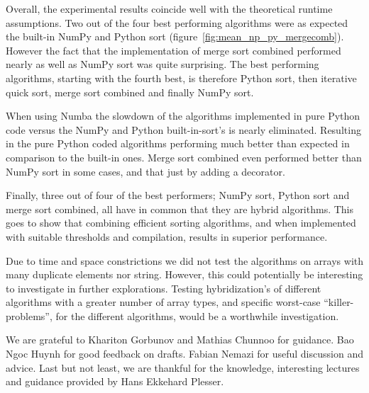 \documentclass[sigconf, nonacm, natbib, screen, balance=False]{acmart}
\begin{document}
Overall, the experimental results coincide well with the theoretical runtime assumptions. Two out of the four best performing algorithms were as expected the built-in NumPy and Python sort (figure~\ref{fig:mean_np_py_mergecomb}). However the fact that the implementation of merge sort combined performed nearly as well as NumPy sort was quite surprising. The best performing algorithms, starting with the fourth best, is therefore Python sort, then iterative quick sort, merge sort combined and finally NumPy sort. 

When using Numba the slowdown of the algorithms implemented in pure Python code versus the NumPy and Python built-in-sort's is nearly eliminated. Resulting in the pure Python coded algorithms performing much better than expected in comparison to the built-in ones. Merge sort combined even performed better than NumPy sort in some cases, and that just by adding a decorator.

Finally, three out of four of the best performers; NumPy sort, Python sort and merge sort combined, all have in common that they are hybrid algorithms. This goes to show that combining efficient sorting algorithms, and when implemented with suitable thresholds and compilation, results in superior performance.

Due to time and space constrictions we did not test the algorithms on arrays with many duplicate elements nor string. However, this could potentially be interesting to investigate in further explorations. Testing hybridization's of different algorithms with a greater number of array types, and specific worst-case ``killer-problems'', for the different algorithms, would be a worthwhile investigation.

\begin{acks}

We are grateful to Khariton Gorbunov and Mathias Chunnoo for guidance. Bao Ngoc Huynh for good feedback on drafts. Fabian Nemazi for useful discussion and advice. Last but not least, we are thankful for the knowledge, interesting lectures and guidance provided by Hans Ekkehard Plesser.

\end{acks}



\end{document}
